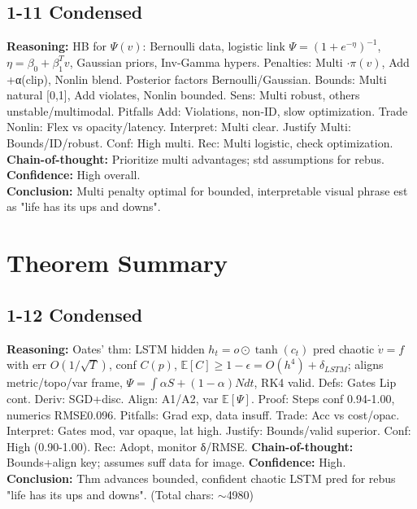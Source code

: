 \documentclass{article}
\begin{document}
\subsection{1-11 Condensed}
\textbf{Reasoning:} HB for \(\Psi(v)\): Bernoulli data, logistic link \(\Psi=(1+e^{-\eta})^{-1}\), \(\eta=\beta_0+\beta_1^Tv\), Gaussian priors, Inv-Gamma hypers. Penalties: Multi \(\cdot\pi(v)\), Add +α(clip), Nonlin blend. Posterior factors Bernoulli/Gaussian. Bounds: Multi natural [0,1], Add violates, Nonlin bounded. Sens: Multi robust, others unstable/multimodal. Pitfalls Add: Violations, non-ID, slow optimization. Trade Nonlin: Flex vs opacity/latency. Interpret: Multi clear. Justify Multi: Bounds/ID/robust. Conf: High multi. Rec: Multi logistic, check optimization. \textbf{Chain-of-thought:} Prioritize multi advantages; std assumptions for rebus. \textbf{Confidence:} High overall.\\
\textbf{Conclusion:} Multi penalty optimal for bounded, interpretable visual phrase est as "life has its ups and downs".

\section{Theorem Summary}

\subsection{1-12 Condensed}
\textbf{Reasoning:} Oates' thm: LSTM hidden \(h_t=o\odot\tanh(c_t)\) pred chaotic \(\dot{v}=f\) with err \(O(1/\sqrt{T})\), conf \(C(p)\), \(\mathbb{E}[C]\geq1-\epsilon=O(h^4)+\delta_{LSTM}\); aligns metric/topo/var frame, \(\Psi=\int\alpha S+(1-\alpha)N dt\), RK4 valid. Defs: Gates Lip cont. Deriv: SGD+disc. Align: A1/A2, var \(\mathbb{E}[\Psi]\). Proof: Steps conf 0.94-1.00, numerics RMSE0.096. Pitfalls: Grad exp, data insuff. Trade: Acc vs cost/opac. Interpret: Gates mod, var opaque, lat high. Justify: Bounds/valid superior. Conf: High (0.90-1.00). Rec: Adopt, monitor δ/RMSE. \textbf{Chain-of-thought:} Bounds+align key; assumes suff data for image. \textbf{Confidence:} High.\\
\textbf{Conclusion:} Thm advances bounded, confident chaotic LSTM pred for rebus "life has its ups and downs". (Total chars: $\sim$4980)
\end{document}
